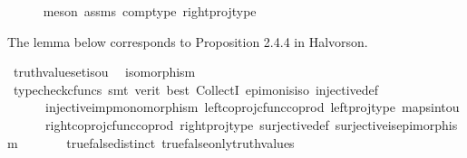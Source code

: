 \begin{isabellebody}
\ \ \ \ \isamarkupfalse%
\ {\isacharparenleft}{\kern0pt}meson\ assms\ comp{\isacharunderscore}{\kern0pt}type\ right{\isacharunderscore}{\kern0pt}proj{\isacharunderscore}{\kern0pt}type{\isacharparenright}{\kern0pt}\isanewline
{}\isamarkupfalse%
%
\endisatagproof
{\isafoldproof}%
%
\isadelimproof
%
\endisadelimproof
%
\begin{isamarkuptext}%
The lemma below corresponds to Proposition 2.4.4 in Halvorson.%
\end{isamarkuptext}\isamarkuptrue%
\isamarkupfalse%
\ truth{\isacharunderscore}{\kern0pt}value{\isacharunderscore}{\kern0pt}set{\isacharunderscore}{\kern0pt}iso{\isacharunderscore}{\kern0pt}{}u{}{\isacharcolon}{\kern0pt}\isanewline
\ \ {\isachardoublequoteopen}isomorphism{\isacharparenleft}{\kern0pt}{\isasymt}{\isasymamalg}{\isasymf}{\isacharparenright}{\kern0pt}{\isachardoublequoteclose}\isanewline
%
\isadelimproof
\ \ %
\endisadelimproof
%
\isatagproof
{}\isamarkupfalse%
\ {\isacharparenleft}{\kern0pt}typecheck{\isacharunderscore}{\kern0pt}cfuncs{\isacharcomma}{\kern0pt}\ smt\ {\isacharparenleft}{\kern0pt}verit{\isacharcomma}{\kern0pt}\ best{\isacharparenright}{\kern0pt}\ CollectI\ epi{\isacharunderscore}{\kern0pt}mon{\isacharunderscore}{\kern0pt}is{\isacharunderscore}{\kern0pt}iso\ injective{\isacharunderscore}{\kern0pt}def{}\isanewline
\ \ \ \ \ \ injective{\isacharunderscore}{\kern0pt}imp{\isacharunderscore}{\kern0pt}monomorphism\ left{\isacharunderscore}{\kern0pt}coproj{\isacharunderscore}{\kern0pt}cfunc{\isacharunderscore}{\kern0pt}coprod\ left{\isacharunderscore}{\kern0pt}proj{\isacharunderscore}{\kern0pt}type\ maps{\isacharunderscore}{\kern0pt}into{\isacharunderscore}{\kern0pt}{}u{}\isanewline
\ \ \ \ \ \ right{\isacharunderscore}{\kern0pt}coproj{\isacharunderscore}{\kern0pt}cfunc{\isacharunderscore}{\kern0pt}coprod\ right{\isacharunderscore}{\kern0pt}proj{\isacharunderscore}{\kern0pt}type\ surjective{\isacharunderscore}{\kern0pt}def{}\ surjective{\isacharunderscore}{\kern0pt}is{\isacharunderscore}{\kern0pt}epimorphism\ \isanewline
\ \ \ \ \ \ true{\isacharunderscore}{\kern0pt}false{\isacharunderscore}{\kern0pt}distinct\ true{\isacharunderscore}{\kern0pt}false{\isacharunderscore}{\kern0pt}only{\isacharunderscore}{\kern0pt}truth{\isacharunderscore}{\kern0pt}values{\isacharparenright}{\kern0pt}%
\endisatagproof
{\isafoldproof}%
%
\isadelimproof
%
\endisadelimproof
%
\isadelimdocument
%
\endisadelimdocument
%
\isatagdocument
%
\end{isabellebody}
